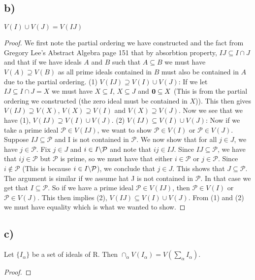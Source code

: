 \documentclass{article}
\theoremstyle{definition}
\begin{document}
\subsection*{b)}
$V(I)\cup V(J)=V(IJ)$
\begin{proof}
We first note the partial ordering we have constructed and the fact from Gregory Lee's Abstract Algebra page 151 that by absorbtion property, $IJ\subseteq I\cap J$ and that if we have ideals $A$ and $B$ such that $A\subseteq B$ we must have $V(A)\supseteq V(B)$ as all prime ideals contained in $B$ must also be contained in $A$ due to the partial ordering.
\newline\newline
(1) $V(IJ)\supseteq V(I)\cup V(J)$:
\newline
If we let $IJ\subseteq I\cap J=X$ we must have $X\subseteq I$, $X\subseteq J$ and $\bold{0}\subseteq X$ (This is from the partial ordering we constructed (the zero ideal must be contained in $X$)). This then gives $V(IJ)\supseteq V(X)$, $V(X)\supseteq V(I)$ and $V(X)\supseteq V(J)$. Now we see that we have (1), $V(IJ)\supseteq V(I)\cup V(J)$.
\newline\newline
(2) $V(IJ)\subseteq V(I)\cup V(J)$:
\newline
Now if we take a prime ideal $\mathcal{P}\in V(IJ)$, we want to show $\mathcal{P}\in V(I)$ or $\mathcal{P}\in V(J)$. Suppose $IJ\subseteq\mathcal{P}$ and I is not contained in $\mathcal{P}$. We now show that for all $j\in J$, we have $j\in \mathcal{P}$. Fix $j\in J$ and $i\in I\symbol{92}\mathcal{P}$ and note that $ij\in IJ$. Since $IJ\subseteq \mathcal{P}$, we have that $ij\in\mathcal{P}$ but $\mathcal{P}$ is prime, so we must have that either $i\in\mathcal{P}$ or $j\in\mathcal{P}$. Since $i\notin\mathcal{P}$ (This is because $i\in I\symbol{92}\mathcal{P}$), we conclude that $j\in J$. This shows that $J\subseteq \mathcal{P}$. The argument is similar if we assume hat J is not contained in $\mathcal{P}$. In that case we get that $I\subseteq\mathcal{P}$. So if we have a prime ideal $\mathcal{P}\in V(IJ)$, then $\mathcal{P}\in V(I)$ or $\mathcal{P}\in V(J)$. This then implies (2), $V(IJ)\subseteq V(I)\cup V(J)$.
\newline\newline
From (1) and (2) we must have equality which is what we wanted to show.
\end{proof}
\subsection*{c)}
Let $\{I_\alpha\}$ be a set of ideals of R. Then $\cap_\alpha V(I_\alpha)=V(\sum_{\alpha}I_\alpha)$.
\begin{proof}
\end{proof}
\end{document}
